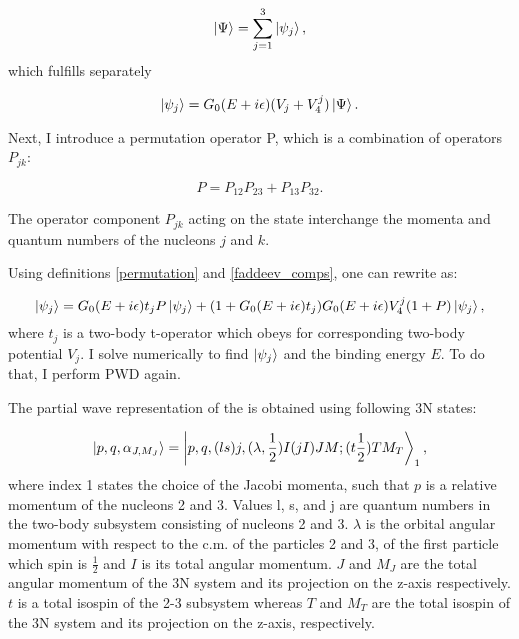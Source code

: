     \begin{equation}
        \ket{\Psi} = \sum_{j=1}^3 \ket{\psi_j},
        \label{faddeev_comps}
    \end{equation}
    which fulfills separately

    \begin{equation}
        \ket{\psi_j} = G_0(E+i\epsilon)(V_j + V_4^j) \ket{\Psi}.
        \label{psi3_component}
    \end{equation}

    Next, I introduce a permutation operator P, which is a combination
    of operators $P_{jk}$:
    
    \begin{equation}
        P = P_{12}P_{23} + P_{13}P_{32}.
        \label{permutation}
    \end{equation}

    The operator component $P_{jk}$ acting on the state interchange the momenta and  
    quantum numbers of the nucleons $j$ and $k$.

    Using definitions \ref{permutation} and \ref{faddeev_comps},
    one can rewrite  as:

    \begin{equation}
        \ket{\psi_j} = G_0(E+i\epsilon)t_j P \ket{\psi_j} + 
        (1 + G_0(E+i\epsilon)t_j)G_0(E+i\epsilon)V_4^j(1+P)\ket{\psi_j},
        \label{fadeed_lse}
    \end{equation}
    where $t_j$ is a two-body t-operator which obeys  for corresponding 
    two-body potential $V_j$. I solve  numerically to find $\ket{\psi_j}$
    and the binding energy $E$. To do that, I perform PWD again.

The partial wave representation of the  is obtained using
following 3N states:

\begin{equation}
    \ket{p,q,\alpha_{J,M_J}} = \ket{p,q,(ls)j, (\lambda, \frac{1}{2})I(jI)JM;(t\frac{1}{2})TM_T}_1,
    \label{3N_PW}
\end{equation}
where index 1 states the choice of the Jacobi momenta, such that $p$ is a relative momentum of the nucleons 2 and 3.
Values l, s, and j are quantum numbers in the two-body subsystem consisting of nucleons 2 and 3. $\lambda$ is the 
orbital angular momentum with respect to the c.m. of the particles 2 and 3,
of the first particle which spin is $\frac{1}{2}$
and $I$ is its total angular momentum.
$J$ and $M_J$ are the total angular momentum of the 3N system and its projection on the z-axis respectively.
$t$ is a total isospin of the 2-3 subsystem whereas $T$ and $M_T$ are the total isospin of the 3N system and its projection on the z-axis, respectively.  

